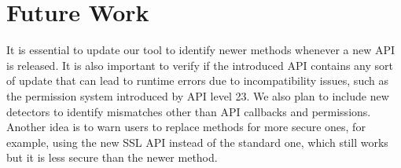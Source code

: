 \section{Future Work}\label{sec-future}

	It is essential to update our tool to identify newer methods whenever a new API is released. It is also important to verify if the introduced API contains any sort of update that can lead to runtime errors due to incompatibility issues, such as the permission system introduced by API level 23. We also plan to include new detectors to identify mismatches other than API callbacks and permissions. Another idea is to warn users to replace methods for more secure ones, for example, using the new SSL API instead of the standard one, which still works but it is less secure than the newer method.\\
